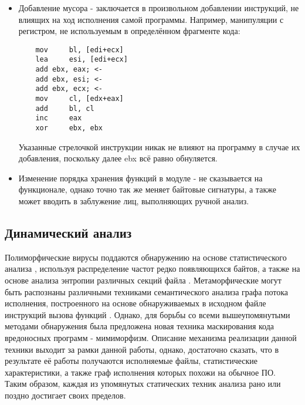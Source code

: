 \begin {itemize}
\begin{lstlisting}
	push    offset aRightAnswer; 1
	push    [ebp+hWnd]; 1
	call    MessageBoxA; 1
	jmp     short loc_4012E8
loc_4012D4:
	push    10h; 2
	push    offset aCaption; 2
	push    offset aWrongAnswer; 2
	push    [ebp+hWnd]; 2
	call    MessageBoxA; 2
loc_4012E8:
	call    ExitProcess
	\end{lstlisting}
	Замена первоначальной инструкции jnz на jz (переход в случае неравенства на переход в случае равенства) и перестановка местами блоков, помеченных как 1 и 2 не меняет смысловую нагрузку, выполняемую программой, однако позволяет значительно поменять её структуру. Это создаёт значительные трудности как в случае автоматического, так и ручного исследования, если таковых замен произведено значительное количество.
	\item Добавление мусора - заключается в произвольном добавлении инструкций, не влиящих на ход исполнения самой программы. Например, манипуляции с регистром, не используемым в определённом фрагменте кода:
	\begin{lstlisting}
	mov     bl, [edi+ecx]
	lea     esi, [edi+ecx]
	add ebx, eax; <-
	add ebx, esi; <-
	add ebx, ecx; <-
	mov     cl, [edx+eax]
	add     bl, cl
	inc     eax
	xor     ebx, ebx
	\end{lstlisting}
	Указанные стрелочкой инструкции никак не влияют на программу в случае их добавления, поскольку далее ebx всё равно обнуляется.
	\item Изменение порядка хранения функций в модуле - не сказывается на функционале, однако точно так же меняет байтовые сигнатуры, а также может вводить в заблужение лиц, выполняющих ручной анализ.
\end {itemize}

\subsection{Динамический анализ}
Полиморфические вирусы поддаются обнаружению на основе статистического анализа \cite{PAYLOADDETECTION, ANAGRAM}, используя распределение частот редко появляющихся байтов, а также на основе анализа энтропии различных секций файла \cite{ENTROPYANALYSIS}. Метаморфические могут быть распознаны различными техниками семантического анализа графа потока исполнения, построенного на основе обнаруживаемых в исходном файле инструкций вызова функций \cite{METAAWARE}. Однако, для борьбы со всеми вышеупомянутыми методами обнаружения была предложена новая техника маскирования кода вредоносных программ - мимиморфизм\cite{MIMIMORPHISM}. Описание механизма реализации данной техники выходит за рамки данной работы, однако, достаточно сказать, что в результате её работы получаются исполняемые файлы, статистические характеристики, а также граф исполнения которых похожи на обычное ПО. Таким образом, каждая из упомянутых статических техник анализа рано или поздно достигает своих пределов.

